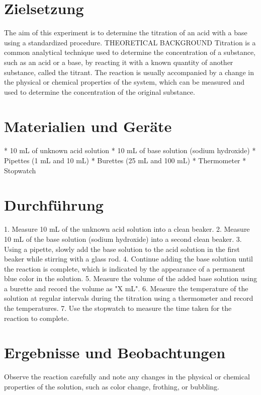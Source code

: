 \documentclass{article}%
\begin{document}
%
\normalsize%
\pagestyle{fancy}%
\fancyhf{}%
%
\fancyhead{[R]{\today}}%
%
\section{Zielsetzung}%
\label{sec:Zielsetzung}%
The aim of this experiment is to determine the titration of an acid with a base using a standardized procedure.
THEORETICAL BACKGROUND
Titration is a common analytical technique used to determine the concentration of a substance, such as an acid or a base, by reacting it with a known quantity of another substance, called the titrant. The reaction is usually accompanied by a change in the physical or chemical properties of the system, which can be measured and used to determine the concentration of the original substance.

%
\section{Materialien und Geräte}%
\label{sec:MaterialienundGerte}%
* 10 mL of unknown acid solution
* 10 mL of base solution (sodium hydroxide)
* Pipettes (1 mL and 10 mL)
* Burettes (25 mL and 100 mL)
* Thermometer
* Stopwatch

%
\section{Durchführung}%
\label{sec:Durchfhrung}%
1. Measure 10 mL of the unknown acid solution into a clean beaker.
2. Measure 10 mL of the base solution (sodium hydroxide) into a second clean beaker.
3. Using a pipette, slowly add the base solution to the acid solution in the first beaker while stirring with a glass rod.
4. Continue adding the base solution until the reaction is complete, which is indicated by the appearance of a permanent blue color in the solution.
5. Measure the volume of the added base solution using a burette and record the volume as "X mL".
6. Measure the temperature of the solution at regular intervals during the titration using a thermometer and record the temperatures.
7. Use the stopwatch to measure the time taken for the reaction to complete.

%
\section{Ergebnisse und Beobachtungen}%
\label{sec:ErgebnisseundBeobachtungen}%
Observe the reaction carefully and note any changes in the physical or chemical properties of the solution, such as color change, frothing, or bubbling.
\end{document}
